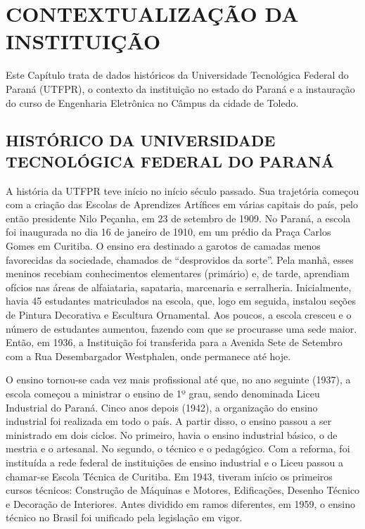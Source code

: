 \chapter{CONTEXTUALIZAÇÃO DA INSTITUIÇÃO}
\label{chap:contex}

Este Capítulo trata de dados históricos da Universidade Tecnológica Federal do Paraná (UTFPR), o contexto da instituição no estado do Paraná e a instauração do curso de Engenharia Eletrônica no Câmpus da cidade de Toledo.

\section{HISTÓRICO DA UNIVERSIDADE TECNOLÓGICA FEDERAL DO PARANÁ}
\label{sec:hist}

A história da UTFPR teve início no início século passado. Sua trajetória começou com a criação das Escolas de Aprendizes Artífices em várias capitais do país, pelo então presidente Nilo Peçanha, em 23 de setembro de 1909. No Paraná, a escola foi inaugurada no dia 16 de janeiro de 1910, em um prédio da Praça Carlos Gomes em Curitiba. O ensino era destinado a garotos de camadas menos favorecidas da sociedade, chamados de ``desprovidos da sorte''. Pela manhã, esses meninos recebiam conhecimentos elementares (primário) e, de tarde, aprendiam ofícios nas áreas de alfaiataria, sapataria, marcenaria e serralheria. Inicialmente, havia 45 estudantes matriculados na escola, que, logo em seguida, instalou seções de Pintura Decorativa e Escultura Ornamental. Aos poucos, a escola cresceu e o número de estudantes aumentou, fazendo com que se procurasse uma sede maior. Então, em 1936, a Instituição foi transferida para a Avenida Sete de Setembro com a Rua Desembargador Westphalen, onde permanece até hoje.

O ensino tornou-se cada vez mais profissional até que, no ano seguinte (1937), a escola começou a ministrar o ensino de 1º grau, sendo denominada Liceu Industrial do Paraná. Cinco anos depois (1942), a organização do ensino industrial foi realizada em todo o país. A partir disso, o ensino passou a ser ministrado em dois ciclos. No primeiro, havia o ensino industrial básico, o de mestria e o artesanal. No segundo, o técnico e o pedagógico. Com a reforma, foi instituída a rede federal de instituições de ensino industrial e o Liceu passou a chamar-se Escola Técnica de Curitiba. Em 1943, tiveram início os primeiros cursos técnicos: Construção de Máquinas e Motores, Edificações, Desenho Técnico e Decoração de Interiores. Antes dividido em ramos diferentes, em 1959, o ensino técnico no Brasil foi unificado pela legislação em vigor.

